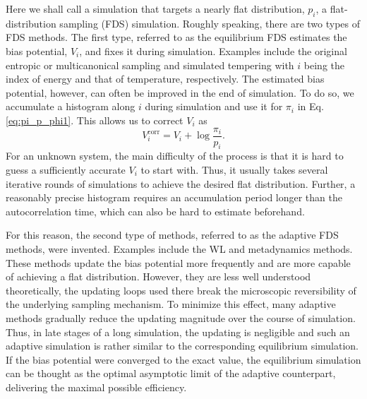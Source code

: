 \documentclass[reprint, floatfix]{revtex4-1}
\begin{document}
Here we shall call a simulation that targets
a nearly flat distribution\cite{dayal2004, trebst2004, singh2011},
$p_i$,
a flat-distribution sampling (FDS) simulation.
%
Roughly speaking, there are two types of FDS methods.
%
The first type,
referred to as the equilibrium FDS %
estimates the bias potential, $V_i$,
and fixes it during simulation.
%
Examples include the original
entropic or multicanonical sampling\cite{berg1992, lee1993}
and simulated tempering\cite{marinari1992, lyubartsev1992}
with $i$ being the index of energy
and that of temperature, respectively.
%
The estimated bias potential, however,
can often be improved in the end of simulation.
%
To do so,
we accumulate a histogram along $i$
during simulation and use it for $\pi_i$ in
Eq. \eqref{eq:pi_p_phi1}.
%
This allows us to correct $V_i$ as
%
\begin{equation}
V_i^{\mathrm{corr}}
=
V_i^{\mathrm{}}
+
\log \frac{ \pi_i } { p_i }.
\label{eq:vcorr_equil}
\end{equation}
%
For an unknown system,
the main difficulty of the process
is that it is hard to guess a sufficiently accurate
$V_i$ to start with.
%
Thus,
it usually takes several iterative rounds of simulations
to achieve the desired flat distribution.
%
Further, a reasonably precise histogram
requires an accumulation period
longer than the autocorrelation time,
which can also be hard to estimate beforehand.

For this reason, the second type of methods,
referred to as the adaptive FDS methods,
were invented.
%
Examples include
the WL and metadynamics methods.
%
These methods update the bias potential more frequently
and are more capable of achieving a flat distribution.
%
However, they are less well understood theoretically,
the updating loops used there
break the microscopic reversibility
of the underlying sampling mechanism.
%
%
To minimize this effect,
many adaptive methods gradually
reduce the updating magnitude
over the course of simulation\cite{marsili2006,
liang2007,
belardinelli2007, belardinelli2007jcp, belardinelli2008}.
%
Thus, in late stages of a long simulation,
the updating is negligible and
such an adaptive simulation is rather similar
to the corresponding equilibrium simulation.
%
If the bias potential were converged to the exact value,
the equilibrium simulation can be thought as
the optimal asymptotic limit of the adaptive counterpart,
delivering the maximal possible efficiency.
\end{document}
